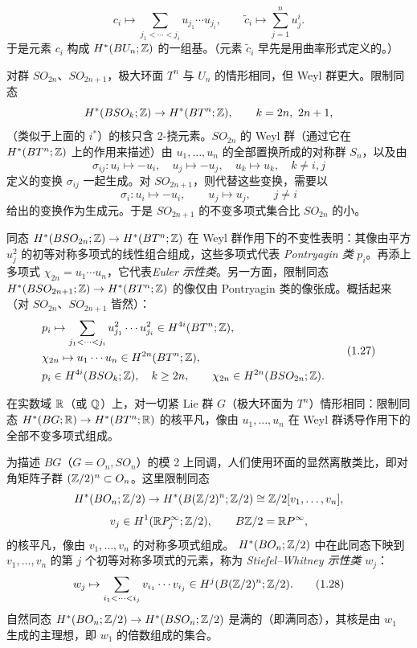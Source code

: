 \begin{equation}
c_i\mapsto\sum_{j_1<\cdots<j_i}u_{j_1}\cdots u_{j_i},\qquad \tilde c_i\mapsto\sum_{j=1}^n u_j^i. \tag{1.24}
\end{equation}
于是元素 $c_i$ 构成 $H^*(BU_n;\mathbb{Z})$ 的一组基。（元素 $\tilde c_i$ 早先是用曲率形式定义的。）

对群 $SO_{2n}$、$SO_{2n+1}$，极大环面 $T^n$ 与 $U_n$ 的情形相同，但 Weyl 群更大。限制同态
\[
H^*(BSO_k;\Z)\to H^*(BT^n;\Z),\qquad k=2n,\ 2n+1,
\]
（类似于上面的 $i^*$）的核只含 2-挠元素。$SO_{2n}$ 的 Weyl 群（通过它在 $H^*(BT^n;\mathbb{Z})$ 上的作用来描述）由 $u_1,\ldots,u_n$ 的全部置换所成的对称群 $S_n$，以及由
\begin{equation}
\sigma_{ij}:u_i\mapsto -u_i,\quad u_j\mapsto -u_j,\quad u_k\mapsto u_k,\quad k\ne i,j \tag{1.25}
\end{equation}
定义的变换 $\sigma_{ij}$ 一起生成。对 $SO_{2n+1}$，则代替这些变换，需要以
\begin{equation}
\sigma_i:u_i\mapsto -u_i,\qquad u_j\mapsto u_j,\qquad j\ne i \tag{1.26}
\end{equation}
给出的变换作为生成元。于是 $SO_{2n+1}$ 的不变多项式集合比 $SO_{2n}$ 的小。

同态 $H^*(BSO_{2n};\mathbb{Z})\to H^*(BT^n;\mathbb{Z})$ 在 Weyl 群作用下的不变性表明：其像由平方 $u_j^2$ 的初等对称多项式的线性组合组成，这些多项式代表 \emph{Pontryagin 类} $p_i$。再添上多项式 $\chi_{2n}=u_1\cdots u_n$，它代表\emph{Euler 示性类}。另一方面，限制同态 $H^*(BSO_{2n+1};\mathbb{Z})\to H^*(BT^n;\mathbb{Z})$ 的像仅由 Pontryagin 类的像张成。概括起来（对 $SO_{2n}$、$SO_{2n+1}$ 皆然）：
\begin{equation}
\begin{aligned}
&p_i\mapsto\sum_{j_1<\cdots<j_i}u_{j_1}^2\cdots u_{j_i}^2\in H^{4i}(BT^n;\mathbb{Z}),\\
&\chi_{2n}\mapsto u_1\cdots u_n\in H^{2n}(BT^n;\mathbb{Z}),\\
&p_i\in H^{4i}(BSO_k;\mathbb{Z}),\quad k\ge2n,\qquad \chi_{2n}\in H^{2n}(BSO_{2n};\mathbb{Z}).
\end{aligned}\tag{1.27}
\end{equation}

在实数域 $\mathbb{R}$（或 $\mathbb{Q}$）上，对一切紧 Lie 群 $G$（极大环面为 $T^n$）情形相同：限制同态 $H^*(BG;\mathbb{R})\to H^*(BT^n;\mathbb{R})$ 的核平凡，像由 $u_1,\ldots,u_n$ 在 Weyl 群诱导作用下的全部不变多项式组成。

为描述 $BG$（$G=O_n,SO_n$）的模 2 上同调，人们使用环面的显然离散类比，即对角矩阵子群 $(\mathbb{Z}/2)^n\subset O_n$。这里限制同态
\[
H^*(BO_n;\mathbb{Z}/2)\to H^*(B(\mathbb{Z}/2)^n;\mathbb{Z}/2)\cong\mathbb{Z}/2[v_1,\ldots,v_n],
\]
\[
v_j\in H^1(\mathbb{R}P_j^\infty;\mathbb{Z}/2),\qquad B\mathbb{Z}/2=\mathbb{R}P^\infty,
\]
的核平凡，像由 $v_1,\ldots,v_n$ 的对称多项式组成。
$H^*(BO_n;\mathbb{Z}/2)$ 中在此同态下映到 $v_1,\ldots,v_n$ 的第 $j$ 个初等对称多项式的元素，称为 \emph{Stiefel--Whitney 示性类} $w_j$：
\begin{equation}
w_j\mapsto\sum_{i_1<\cdots<i_j}v_{i_1}\cdots v_{i_j}\in H^j(B(\mathbb{Z}/2)^n;\mathbb{Z}/2). \tag{1.28}
\end{equation}
自然同态 $H^*(BO_n;\mathbb{Z}/2)\to H^*(BSO_n;\mathbb{Z}/2)$ 是满的（即满同态），其核是由 $w_1$ 生成的主理想，即 $w_1$ 的倍数组成的集合。

